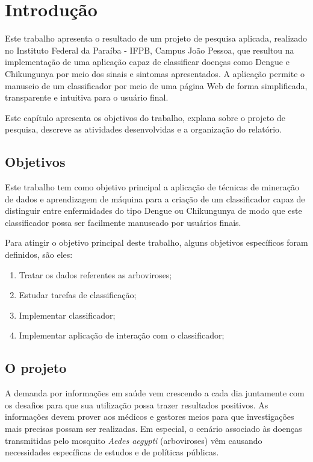\chapter{Introdução}

Este trabalho apresenta o resultado de um projeto de pesquisa aplicada, realizado no Instituto Federal da Paraíba - IFPB, Campus João Pessoa, que resultou na implementação de uma aplicação capaz de classificar doenças como Dengue e Chikungunya por meio dos sinais e sintomas apresentados. A aplicação permite o manuseio de um classificador por meio de uma página Web de forma simplificada, transparente e intuitiva para o usuário final.

Este capítulo apresenta os objetivos do trabalho, explana sobre o projeto de pesquisa, descreve as atividades desenvolvidas e a organização do relatório.

\section{Objetivos}

Este trabalho tem como objetivo principal a aplicação de técnicas de mineração de dados e aprendizagem de máquina para a criação de um classificador capaz de distinguir entre enfermidades do tipo Dengue ou Chikungunya de modo que este classificador possa ser facilmente manuseado por usuários finais.

Para atingir o objetivo principal deste trabalho, alguns objetivos específicos foram definidos, são eles:

\begin{enumerate}
  \item Tratar os dados referentes as arboviroses;
  \item Estudar tarefas de classificação;
  \item Implementar classificador;
  \item Implementar aplicação de interação com o classificador;
\end{enumerate}


\section{O projeto}

A demanda por informações em saúde vem crescendo a cada dia juntamente com os desafios para que sua utilização possa trazer resultados positivos. As informações devem prover aos médicos e gestores meios para que investigações mais precisas possam ser realizadas. Em especial, o cenário associado às doenças transmitidas pelo mosquito \emph{Aedes aegypti} (arboviroses) vêm causando necessidades específicas de estudos e de políticas públicas. 

